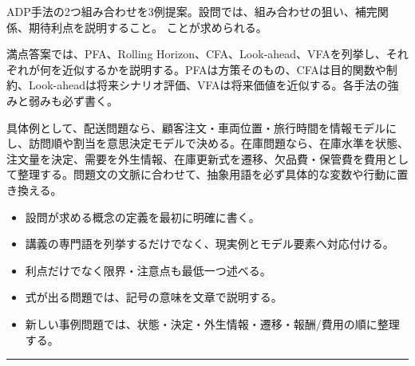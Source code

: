 \clearpage{}
ADP手法の2つ組み合わせを3例提案。設問では、組み合わせの狙い、補完関係、期待利点を説明すること。 ことが求められる。\par
{}
満点答案では、PFA、Rolling Horizon、CFA、Look-ahead、VFAを列挙し、それぞれが何を近似するかを説明する。PFAは方策そのもの、CFAは目的関数や制約、Look-aheadは将来シナリオ評価、VFAは将来価値を近似する。各手法の強みと弱みも必ず書く。\par
{}
具体例として、配送問題なら、顧客注文・車両位置・旅行時間を情報モデルにし、訪問順や割当を意思決定モデルで決める。在庫問題なら、在庫水準を状態、注文量を決定、需要を外生情報、在庫更新式を遷移、欠品費・保管費を費用として整理する。問題文の文脈に合わせて、抽象用語を必ず具体的な変数や行動に置き換える。\par
{}
\begin{itemize}
\item 設問が求める概念の定義を最初に明確に書く。
\item 講義の専門語を列挙するだけでなく、現実例とモデル要素へ対応付ける。
\item 利点だけでなく限界・注意点も最低一つ述べる。
\item 式が出る問題では、記号の意味を文章で説明する。
\item 新しい事例問題では、状態・決定・外生情報・遷移・報酬/費用の順に整理する。
\end{itemize}
\vspace{2mm}\hrule\vspace{2mm}